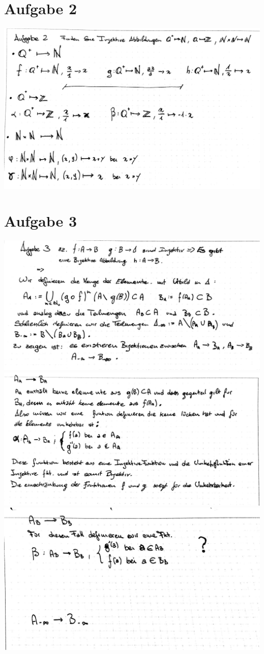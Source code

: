 \documentclass[12pt,a4paper,landscape]{article}
\begin{document}
\section*{Aufgabe 2}
\includegraphics[scale=0.3]{AB2-2_1.jpg} 
\section*{Aufgabe 3}
\includegraphics[scale=0.3]{Ab2-3_1.jpg} \newpage
\includegraphics[scale=0.3]{Ab2-3_2.jpg} \newpage
\includegraphics[scale=0.3]{Ab2-3_3.jpg} 
\end{document}
